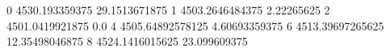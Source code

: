 0 4530.193359375 29.1513671875
1 4503.2646484375 2.22265625
2 4501.0419921875 0.0
4 4505.64892578125 4.60693359375
6 4513.39697265625 12.35498046875
8 4524.1416015625 23.099609375
